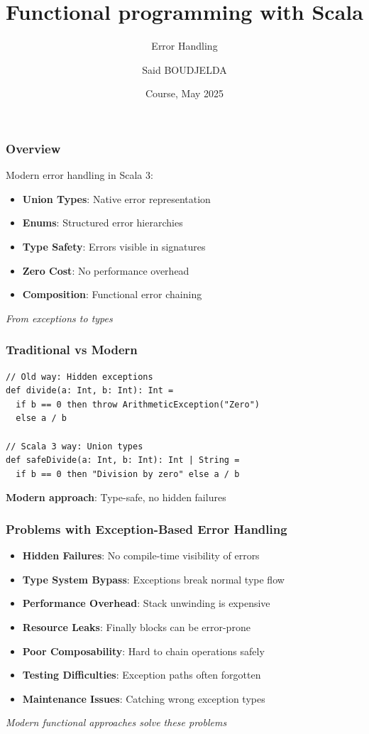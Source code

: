 \documentclass{beamer}
\title[Error Handling in Scala]
{Functional programming with Scala}
\subtitle{Error Handling}
\author[Said BOUDJELDA]
{Said BOUDJELDA}
\institute[efrei]
{
  Senior Software Engineer @SCIAM\\
  GitHub @bmscomp
}
\date[efrei 2025]
{Course, May 2025}
\begin{document}
\frame{\titlepage}

\begin{frame}
\frametitle{Overview}

Modern error handling in Scala 3:

\begin{itemize}
\item \textbf{Union Types}: Native error representation
\item \textbf{Enums}: Structured error hierarchies
\item \textbf{Type Safety}: Errors visible in signatures
\item \textbf{Zero Cost}: No performance overhead
\item \textbf{Composition}: Functional error chaining
\end{itemize}

\textit{From exceptions to types}

\end{frame}

\begin{frame}[fragile]
\frametitle{Traditional vs Modern}

\begin{lstlisting}[style=scalaStyle]
// Old way: Hidden exceptions
def divide(a: Int, b: Int): Int = 
  if b == 0 then throw ArithmeticException("Zero")
  else a / b

// Scala 3 way: Union types
def safeDivide(a: Int, b: Int): Int | String = 
  if b == 0 then "Division by zero" else a / b
\end{lstlisting}

\textbf{Modern approach}: Type-safe, no hidden failures

\end{frame}

\begin{frame}
\frametitle{Problems with Exception-Based Error Handling}

\begin{itemize}
  \item \textbf{Hidden Failures}: No compile-time visibility of errors
  \item \textbf{Type System Bypass}: Exceptions break normal type flow
  \item \textbf{Performance Overhead}: Stack unwinding is expensive
  \item \textbf{Resource Leaks}: Finally blocks can be error-prone
  \item \textbf{Poor Composability}: Hard to chain operations safely
  \item \textbf{Testing Difficulties}: Exception paths often forgotten
  \item \textbf{Maintenance Issues}: Catching wrong exception types
\end{itemize}

\vspace{0.3cm}
\textit{Modern functional approaches solve these problems}

\end{frame}
\end{document}
